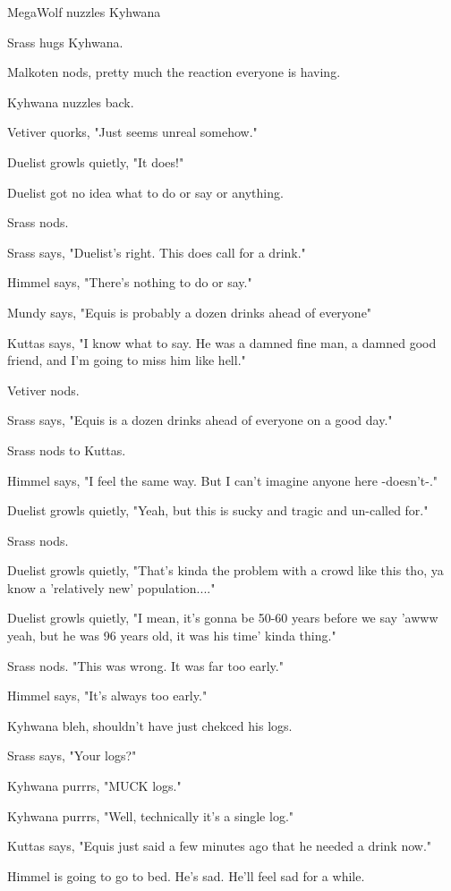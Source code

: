MegaWolf nuzzles Kyhwana

Srass hugs Kyhwana.

Malkoten nods, pretty much the reaction everyone is having.

Kyhwana nuzzles back.

Vetiver quorks, "Just seems unreal somehow."

Duelist growls quietly, "It does!"

Duelist got no idea what to do or say or anything.

Srass nods.

Srass says, "Duelist's right.  This does call for a drink."

Himmel says, "There's nothing to do or say."

Mundy says, "Equis is probably a dozen drinks ahead of everyone"

Kuttas says, "I know what to say. He was a damned fine man, a damned good friend, and I'm going to miss him like hell."

Vetiver nods.

Srass says, "Equis is a dozen drinks ahead of everyone on a good day."

Srass nods to Kuttas.

Himmel says, "I feel the same way. But I can't imagine anyone here -doesn't-."

Duelist growls quietly, "Yeah, but this is sucky and tragic and un-called for."

Srass nods.

Duelist growls quietly, "That's kinda the problem with a crowd like this tho, ya know a 'relatively new' population...."

Duelist growls quietly, "I mean, it's gonna be 50-60 years before we say 'awww yeah, but he was 96 years old, it was his time' kinda thing."

Srass nods.  "This was wrong.  It was far too early."

Himmel says, "It's always too early."

Kyhwana bleh, shouldn't have just chekced his logs.

Srass says, "Your logs?"

Kyhwana purrrs, "MUCK logs."

Kyhwana purrrs, "Well, technically it's a single log."

Kuttas says, "Equis just said a few minutes ago that he needed a drink now."

Himmel is going to go to bed. He's sad. He'll feel sad for a while.

